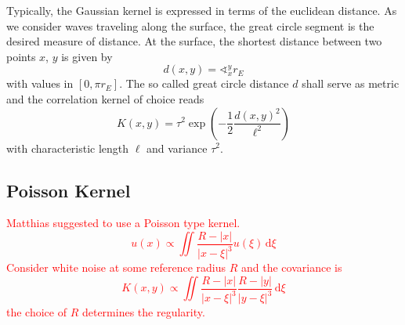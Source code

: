 \documentclass[11pt]{article}
\newcommand\worries[1]{\textcolor{red}{#1}}
\begin{document}
Typically, the Gaussian kernel is expressed in terms of the euclidean distance.
As we consider waves traveling along the surface, the great circle segment is the desired measure of distance.
At the surface, the shortest distance between two points $x$, $y$ is given by
\begin{equation}
    d(x,y) = \sphericalangle_x^y r_E
\end{equation}
with values in $[0, \pi r_E]$.
The so called great circle distance $d$ shall serve as metric and the correlation kernel of choice reads
\begin{equation}
    K(x,y) = \tau^2 \exp\!\left(-\frac 12 \frac{d(x,y)^2}{\ell^2}\right)
\end{equation}
with characteristic length $\ell$ and variance $\tau^2$.

\subsection{Poisson Kernel}
\worries{Matthias suggested to use a Poisson type kernel.
\begin{equation}
    u(x) \propto \iint \frac{R-|x|}{|x-\xi|^3} u(\xi) \, \mathrm d \xi
\end{equation}
Consider white noise at some reference radius $R$ and the covariance is
\begin{equation}
    K(x,y) \propto \iint \frac{R-|x|}{|x-\xi|^3} \frac{R-|y|}{|y-\xi|^3} \, \mathrm d \xi
\end{equation}
the choice of $R$ determines the regularity. }

\end{document}

